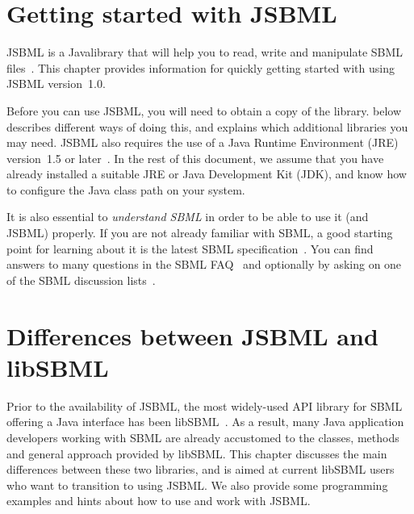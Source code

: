 \documentclass{JSBMLdoc}
\begin{document}
\maketitlepage
\maketableofcontents
\clearpage


\chapter{Getting started with JSBML}
\label{chp:getting-started}

JSBML is a Java\TTra library that will help you to read, write and
manipulate SBML files~\cite{Draeger2011a, Draeger2011b}. This chapter
provides information for quickly getting started with using JSBML
version~1.0.

Before you can use JSBML, you will need to obtain a copy of the library.
 below describes different ways of doing
this, and explains which additional libraries you may need. JSBML also
requires the use of a Java Runtime Environment (JRE) version~1.5 or
later~\cite{JavaDownloadURL}.  In the
rest of this document, we assume that you have already installed a suitable
JRE or Java Development Kit (JDK), and know how to configure the Java class
path on your system. 

It is also essential to \emph{understand SBML} in order to be able to use
it (and JSBML) properly. If you are not already familiar with SBML, a good
starting point for learning about it is the latest SBML
specification~\cite{SBMLspecs}. You can find answers to many questions in
the SBML FAQ~\cite{SBMLFAQ} and optionally by asking on one of the SBML
discussion lists~\cite{SBMLforums}.






\chapter{Differences between JSBML and libSBML}
\label{chp:jsbml-libsbml-diffs}

Prior to the availability of JSBML, the most widely-used API library for
SBML offering a Java interface has been libSBML~\cite{Bornstein2008}. As a
result, many Java application developers working with SBML are already
accustomed to the classes, methods and general approach provided by
libSBML. This chapter discusses the main differences between these two
libraries, and is aimed at current libSBML users who want to transition to
using JSBML. We also provide some programming examples and hints about how
to use and work with JSBML.
\end{document}
